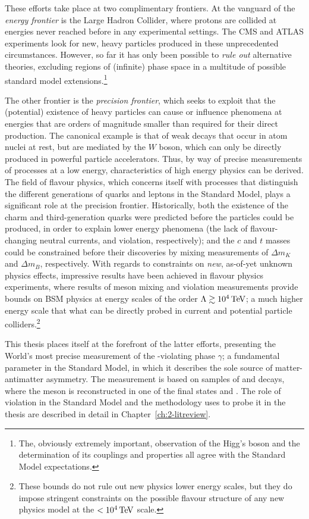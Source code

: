 These efforts take place at two complimentary frontiers. At the vanguard of the \emph{energy frontier} is the Large Hadron Collider, where protons are collided at energies never reached before in any experimental settings. The CMS and ATLAS experiments look for new, heavy particles produced in these unprecedented circumstances. However, so far it has only been possible to \emph{rule out} alternative theories, excluding regions of (infinite) phase space in a multitude of possible standard model extensions.\footnote{The, obviously extremely important, observation of the Higg's boson and the determination of its couplings and properties all agree with the Standard Model expectations.} 

The other frontier is the \emph{precision frontier}, which seeks to exploit that the (potential) existence of heavy particles can cause or influence phenomena at energies that are orders of magnitude smaller than required for their direct production. The canonical example is that of weak decays that occur in atom nuclei at rest, but are mediated by the $W$ boson, which can only be directly produced in powerful particle accelerators. Thus, by way of precise measurements of processes at a low energy, characteristics of high energy physics can be derived. The field of flavour physics, which concerns itself with processes that distinguish the different generations of quarks and leptons in the Standard Model, plays a significant role at the precision frontier. Historically, both the existence of the charm and third-generation quarks were predicted before the particles could be produced, in order to explain lower energy phenomena (the lack of flavour-changing neutral currents, and \CP violation, respectively); and the $c$ and $t$ masses could be constrained before their discoveries by mixing measurements of $\Delta m_K$ and $\Delta m_B$, respectively. With regards to constraints on \emph{new}, as-of-yet unknown physics effects, impressive results have been achieved in flavour physics experiments, where results of meson mixing and \CP violation measurements provide bounds on BSM physics at energy scales of the order $\Lambda \gtrsim 10^{4}\text{\,Te\kern -0.1em V}$; a much higher energy scale that what can be directly probed in current and potential particle colliders.\footnote{These bounds do not rule out new physics lower energy scales, but they do impose stringent constraints on the possible flavour structure of any new physics model at the $<10^{4}\text{\,Te\kern -0.1em V}$ scale.}

This thesis places itself at the forefront of the latter efforts, presenting the World's most precise measurement of the \CP-violating phase $\gamma$; a fundamental parameter in the Standard Model, in which it describes the sole source of matter-antimatter asymmetry. The measurement is based on samples of \BtoDK and \BtoDpi decays, where the \D meson is reconstructed in one of the final states \Kspipi and \KsKK. The role of \CP violation in the Standard Model and the methodology uses to probe it in the thesis are described in detail in Chapter~\ref{ch:2-litreview}.

